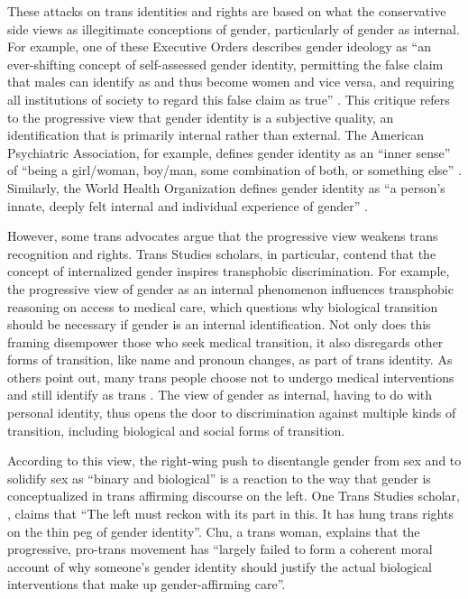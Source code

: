 \documentclass[anonymous,review]{acmart}
\begin{document}
These attacks on trans identities and rights are based on what the conservative side views as illegitimate conceptions of gender, particularly of gender as internal. For example, one of these Executive Orders describes gender ideology as “an ever-shifting concept of self-assessed gender identity, permitting the false claim that males can identify as and thus become women and vice versa, and requiring all institutions of society to regard this false claim as true” \citep{whitehousea:2025}. This critique refers to the progressive view that gender identity is a subjective quality, an identification that is primarily internal rather than external. The American Psychiatric Association, for example, defines gender identity as an “inner sense” of  “being a girl/woman, boy/man, some combination of both, or something else” \citep{drescher:2025}. Similarly, the World Health Organization defines gender identity as “a person’s innate, deeply felt internal and individual experience of gender” \citep{who:2026}.

However, some trans advocates argue that the progressive view weakens trans recognition and rights. Trans Studies scholars, in particular, contend that the concept of internalized gender inspires transphobic discrimination. For example, the progressive view of gender as an internal phenomenon influences transphobic reasoning on access to medical care, which questions why biological transition should be necessary if gender is an internal identification. Not only does this framing disempower those who seek medical transition, it also disregards other forms of transition, like name and pronoun changes, as part of trans identity. As others point out, many trans people choose not to undergo medical interventions and still identify as trans \citep{kirzinger:2023}. The view of gender as internal, having to do with personal identity, thus opens the door to discrimination against multiple kinds of transition, including biological and social forms of transition.

According to this view, the right-wing push to disentangle gender from sex and to solidify sex as “binary and biological” is a reaction to the way that gender is conceptualized in trans affirming discourse on the left. One Trans Studies scholar, \citet{chu:2024}, claims that “The left must reckon with its part in this. It has hung trans rights on the thin peg of gender identity”. Chu, a trans woman, explains that the progressive, pro-trans movement has “largely failed to form a coherent moral account of why someone’s gender identity should justify the actual biological interventions that make up gender-affirming care”.
\end{document}
